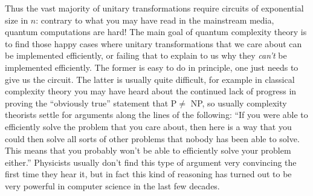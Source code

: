 \documentclass[12pt]{article}
\begin{document}
Thus the vast majority of unitary transformations require circuits of exponential size in $n$: contrary to what you may have read in the mainstream media, quantum computations are hard!  The main goal of quantum complexity theory is to find those happy cases where unitary transformations that we care about can be implemented efficiently, or failing that to explain to us why they \textit{can't} be implemented efficiently.  The former is easy to do in principle, one just needs to give us the circuit.  The latter is usually quite difficult, for example in classical complexity theory you may have heard about the continued lack of progress in proving the ``obviously true'' statement that P$\neq$ NP, so usually complexity theorists settle for arguments along the lines of the following: ``If you were able to efficiently solve the problem that you care about, then here is a way that you could then solve all sorts of other problems that nobody has been able to solve.  This means that you probably won't be able to efficiently solve your problem either.''  Physicists usually don't find this type of argument very convincing the first time they hear it, but in fact this kind of reasoning has turned out to be very powerful in computer science in the last few decades.

 
\end{document}
